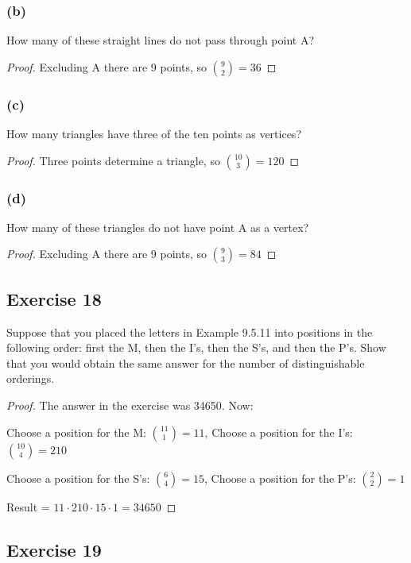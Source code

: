 \documentclass[14pt]{extarticle}
\begin{document}
\subsubsection{(b)}
How many of these straight lines do not pass through point A?

\begin{proof}
Excluding A there are 9 points, so \(\binom{9}{2} = 36\)
\end{proof}

\subsubsection{(c)}
How many triangles have three of the ten points as vertices?

\begin{proof}
Three points determine a triangle, so \(\binom{10}{3} = 120\)
\end{proof}

\subsubsection{(d)}
How many of these triangles do not have point A as a vertex?

\begin{proof}
Excluding A there are 9 points, so \(\binom{9}{3} = 84\)
\end{proof}

\subsection{Exercise 18}
Suppose that you placed the letters in Example 9.5.11 into positions in the following order: first the M, then the 
I’s, then the S’s, and then the P’s. Show that you would obtain the same answer for the number of distinguishable 
orderings.

\begin{proof}
The answer in the exercise was 34650. Now:

Choose a position for the M: \(\binom{11}{1} = 11\), 
Choose a position for the I's: \(\binom{10}{4} = 210\)

Choose a position for the S's: \(\binom{6}{4} = 15\), 
Choose a position for the P's: \(\binom{2}{2} = 1\)

Result = \(11 \cdot 210 \cdot 15 \cdot 1 = 34650\)
\end{proof}

\subsection{Exercise 19}
\end{document}
